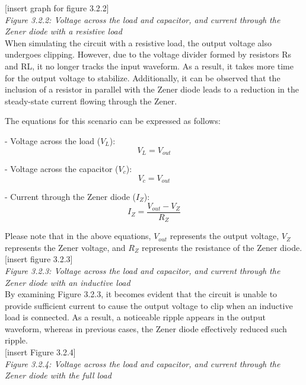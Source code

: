 [insert graph for figure 3.2.2]\\

\emph{Figure 3.2.2: Voltage across the load and capacitor, and current through the Zener diode with a resistive load
}\\


When simulating the circuit with a resistive load, the output voltage also undergoes clipping. However, due to the voltage divider formed by resistors Rs and RL, it no longer tracks the input waveform. As a result, it takes more time for the output voltage to stabilize. Additionally, it can be observed that the inclusion of a resistor in parallel with the Zener diode leads to a reduction in the steady-state current flowing through the Zener.

The equations for this scenario can be expressed as follows:

- Voltage across the load ($V_L$):
\[V_L = V_{out}\]

- Voltage across the capacitor ($V_c$):
\[V_c = V_{out}\]

- Current through the Zener diode ($I_Z$):
\[I_Z = \frac{V_{out} - V_Z}{R_Z}\]

Please note that in the above equations, $V_{out}$ represents the output voltage, $V_Z$ represents the Zener voltage, and $R_Z$ represents the resistance of the Zener diode.\\

[insert figure 3.2.3]\\

\emph{Figure 3.2.3: Voltage across the load and capacitor, and current through the Zener diode with an inductive load}\\

By examining Figure 3.2.3, it becomes evident that the circuit is unable to provide sufficient current to cause the output voltage to clip when an inductive load is connected. As a result, a noticeable ripple appears in the output waveform, whereas in previous cases, the Zener diode effectively reduced such ripple.\\

[insert Figure 3.2.4]\\

\emph{Figure 3.2.4: Voltage across the load and capacitor, and current through the Zener diode with the full load}\\

